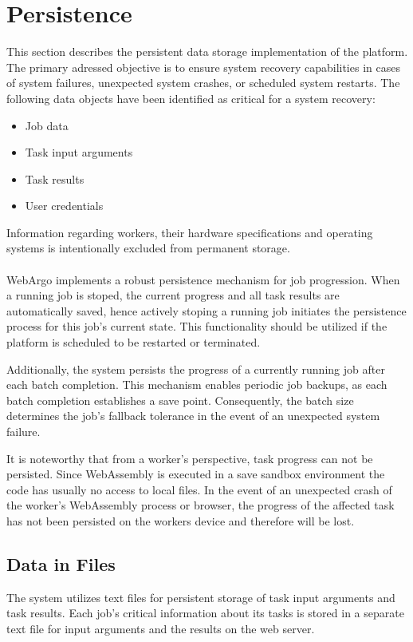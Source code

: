 \section{Persistence}
\label{sec:implementation:persistence}
This section describes the persistent data storage implementation of the platform. The primary adressed objective is to ensure system recovery capabilities in cases of system failures, unexpected system crashes, or scheduled system restarts. The following data objects have been identified as critical for a system recovery:
\begin{itemize}
    \item Job data
    \item Task input arguments
    \item Task results
    \item User credentials
\end{itemize}
Information regarding workers, their hardware specifications and operating systems is intentionally excluded from permanent storage.
\\~\\
WebArgo implements a robust persistence mechanism for job progression. When a running job is stoped, the current progress and all task results are automatically saved, hence actively stoping a running job initiates the persistence process for this job's current state. This functionality should be utilized if the platform is scheduled to be restarted or terminated.

Additionally, the system persists the progress of a currently running job after each batch completion. This mechanism enables periodic job backups, as each batch completion establishes a save point. Consequently, the batch size determines the job's fallback tolerance in the event of an unexpected system failure.

It is noteworthy that from a worker's perspective, task progress can not be persisted. Since WebAssembly is executed in a save sandbox environment the code has usually no access to local files. In the event of an unexpected crash of the worker's WebAssembly process or browser, the progress of the affected task has not been persisted on the workers device and therefore will be lost.

\subsection{Data in Files}
The system utilizes text files for persistent storage of task input arguments and task results. Each job's critical information about its tasks is stored in a separate text file for input arguments and the results on the web server. 

